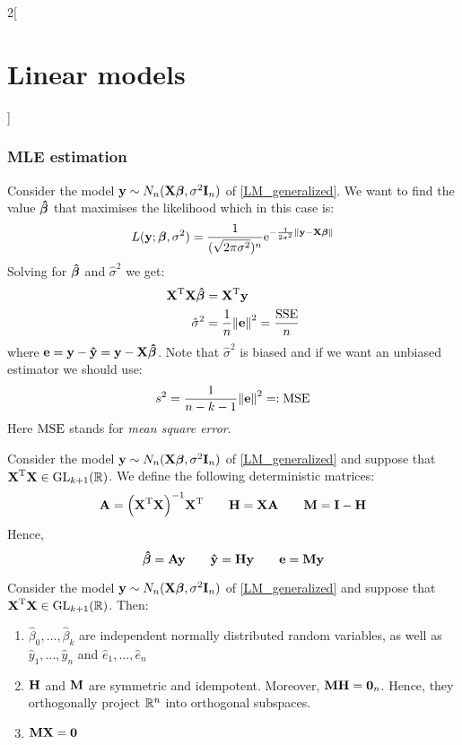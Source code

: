 \documentclass[../../../main_math.tex]{subfiles}
\begin{document}
\begin{multicols}{2}[\section{Linear models}]
  \subsubsection{MLE estimation}
  \begin{proposition}
    Consider the model $\boldsymbol{\mathrm{y}}\sim N_n(\boldsymbol{\mathrm{X\beta}},\sigma^2\boldsymbol{\mathrm{I}}_n)$ of \cref{LM_generalized}. We want to find the value $\boldsymbol{\mathrm{\hat\beta}}$ that maximises the likelihood which in this case is: $$L(\boldsymbol{\mathrm{y}};\boldsymbol{\mathrm{\beta}},\sigma^2)=\frac{1}{(\sqrt{2\pi\sigma^2})^n}\mathrm{e}^{-\frac{1}{2\sigma^2}{\left\|\boldsymbol{\mathrm{y}}-\boldsymbol{\mathrm{X\beta}}\right\|}}$$
    Solving for $\boldsymbol{\mathrm{\hat\beta}}$ and ${\hat\sigma}^2$ we get:
    \begin{align*}
      {\boldsymbol{\mathrm{X}}}^{\mathrm{T}}\boldsymbol{\mathrm{X\hat\beta}} & ={\boldsymbol{\mathrm{X}}}^{\mathrm{T}}\boldsymbol{\mathrm{y}}                            \\
      {\hat\sigma}^2                    & =\frac{1}{n}{\left\|\boldsymbol{\mathrm{e}}\right\|}^2=\frac{\mathrm{SSE}}{n}
    \end{align*}
    where $\boldsymbol{\mathrm{e}}=\boldsymbol{\mathrm{y}}-\boldsymbol{\mathrm{\hat{y}}}=\boldsymbol{\mathrm{y}}-\boldsymbol{\mathrm{X\hat{\beta}}}$. Note that ${\hat\sigma}^2$ is biased and if we want an unbiased estimator we should use:
    $${s}^2=\frac{1}{n-k-1}{\left\|\boldsymbol{\mathrm{e}}\right\|}^2=:\operatorname{MSE}$$
    Here $\operatorname{MSE}$ stands for \emph{mean square error}.
  \end{proposition}
  \begin{definition}
    Consider the model $\boldsymbol{\mathrm{y}}\sim N_n(\boldsymbol{\mathrm{X\beta}},\sigma^2\boldsymbol{\mathrm{I}}_n)$ of \cref{LM_generalized} and suppose that ${\boldsymbol{\mathrm{X}}}^{\mathrm{T}}\boldsymbol{\mathrm{X}}\in\mathrm{GL}_{k+1}(\mathbb{R})$. We define the following deterministic matrices:
    $$\boldsymbol{\mathrm{A}}={\left({\boldsymbol{\mathrm{X}}}^{\mathrm{T}}\boldsymbol{\mathrm{X}}\right)}^{-1}{\boldsymbol{\mathrm{X}}}^{\mathrm{T}}\qquad \boldsymbol{\mathrm{H}}=\boldsymbol{\mathrm{XA}}\qquad \boldsymbol{\mathrm{M}}=\boldsymbol{\mathrm{I}}-\boldsymbol{\mathrm{H}}$$
    Hence, $$\boldsymbol{\mathrm{\hat\beta}}=\boldsymbol{\mathrm{Ay}}\qquad\boldsymbol{\mathrm{\hat{y}}}=\boldsymbol{\mathrm{Hy}}\qquad\boldsymbol{\mathrm{e}}=\boldsymbol{\mathrm{My}}$$
  \end{definition}
  \begin{proposition}
    Consider the model $\boldsymbol{\mathrm{y}}\sim N_n(\boldsymbol{\mathrm{X\beta}},\sigma^2\boldsymbol{\mathrm{I}}_n)$ of \cref{LM_generalized} and suppose that ${\boldsymbol{\mathrm{X}}}^{\mathrm{T}}\boldsymbol{\mathrm{X}}\in\mathrm{GL}_{k+1}(\mathbb{R})$. Then:
    \begin{enumerate}
      \item $\hat\beta_0,\ldots,\hat\beta_k$ are independent normally distributed random variables, as well as $\hat{y}_1,\ldots,\hat{y}_n$ and $\hat{e}_1,\ldots,\hat{e}_n$
      \item $\boldsymbol{\mathrm{H}}$ and $\boldsymbol{\mathrm{M}}$ are symmetric and idempotent. Moreover, $\boldsymbol{\mathrm{MH}}=\boldsymbol{\mathrm{0}}_n$. Hence, they orthogonally project $\mathbb{R}^n$ into orthogonal subspaces.
      \item $\boldsymbol{\mathrm{MX}}=\boldsymbol{\mathrm{0}}$

\end{enumerate}
\end{proposition}
\end{multicols}
\end{document}
